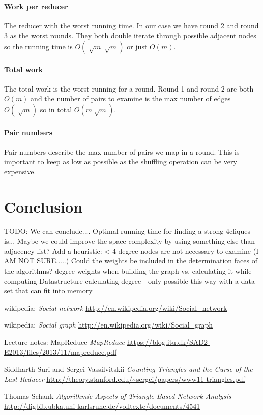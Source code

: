 \documentclass{article}
\begin{document}
\paragraph{Work per reducer}
The reducer with the worst running time. In our case we have round 2 and round 3 as the worst rounds. They both double iterate through possible adjacent nodes so the running time is $O(\sqrt[]{m}\sqrt[]{m})$ or just $O(m)$.

\paragraph{Total work}
The total work is the worst running for a round. Round 1 and round 2 are both $O(m)$ and the number of pairs to examine is the max number of edges $O(\sqrt[]{m})$ so in total $O(m\sqrt[]{m})$.

\paragraph{Pair numbers}
Pair numbers describe the max number of pairs we map in a round. This is important to keep as low as possible as the shuffling operation can be very expensive.



\section{Conclusion}
TODO: We can conclude....
Optimal running time for finding a strong 4cliques is...
Maybe we could improve the space complexity by using something else than adjacency list?
Add a heuristic: < 4 degree nodes are not necessary to examine (I AM NOT SURE.....)
Could the weights be included in the determination faces of the algorithms?
degree weights when building the graph vs. calculating it while computing
Datastructure calculating degree - only possible this way with a data set that can fit into memory

\begin{thebibliography}{1}

    wikipedia:
    \emph{Social network}
    \url{http://en.wikipedia.org/wiki/Social_network}

    wikipedia:
    \emph{Social graph}
    \url{http://en.wikipedia.org/wiki/Social_graph}

    Lecture notes: MapReduce
    \emph{MapReduce}
    \url{https://blog.itu.dk/SAD2-E2013/files/2013/11/mapreduce.pdf}

    Siddharth Suri and Sergei Vassilvitskii
    \emph{Counting Triangles and the Curse of the Last Reducer}
    \url{http://theory.stanford.edu/~sergei/papers/www11-triangles.pdf}

    Thomas Schank
    \emph{Algorithmic Aspects of Triangle-Based Network Analysis}
    \url{http://digbib.ubka.uni-karlsruhe.de/volltexte/documents/4541}
    
\end{thebibliography}
\end{document}
